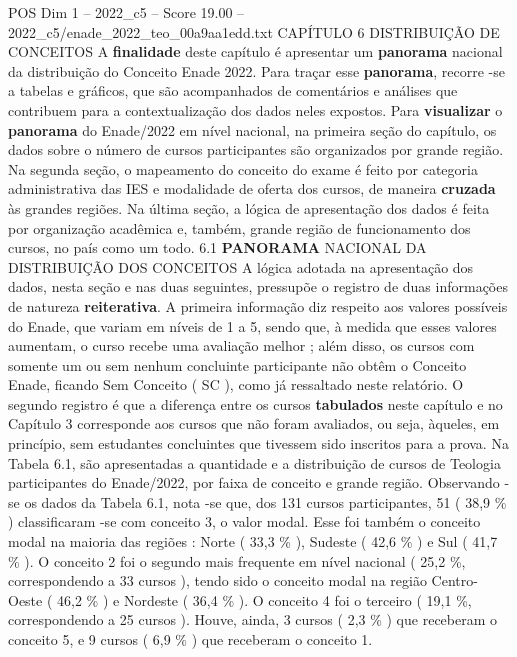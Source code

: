 \begin{textsample}{POS Dim 1 – 2022\_c5 – Score 19.00 – 2022\_c5/enade\_2022\_teo\_00a9aa1edd.txt}  \label{ex:f1_pos_030}
CAPÍTULO 6 DISTRIBUIÇÃO DE CONCEITOS A \textbf{finalidade} deste capítulo é apresentar um \textbf{panorama} nacional da distribuição do Conceito Enade 2022.
Para traçar esse \textbf{panorama}, recorre -se a tabelas e gráficos, que são acompanhados de comentários e análises que contribuem para a contextualização dos dados neles expostos.
Para \textbf{visualizar} o \textbf{panorama} do Enade/2022 em nível nacional, na primeira seção do capítulo, os dados sobre o número de cursos participantes são organizados por grande região.
Na segunda seção, o mapeamento do conceito do exame é feito por categoria administrativa das IES e modalidade de oferta dos cursos, de maneira \textbf{cruzada} às grandes regiões.
Na última seção, a lógica de apresentação dos dados é feita por organização acadêmica e, também, grande região de funcionamento dos cursos, no país como um todo. 6.1 \textbf{PANORAMA} NACIONAL DA DISTRIBUIÇÃO DOS CONCEITOS A lógica adotada na apresentação dos dados, nesta seção e nas duas seguintes, pressupõe o registro de duas informações de natureza \textbf{reiterativa}.
A primeira informação diz respeito aos valores possíveis do Enade, que variam em níveis de 1 a 5, sendo que, à medida que esses valores aumentam, o curso recebe uma avaliação melhor ; além disso, os cursos com somente um ou sem nenhum concluinte participante não obtêm o Conceito Enade, ficando Sem Conceito ( SC ), como já ressaltado neste relatório.
O segundo registro é que a diferença entre os cursos \textbf{tabulados} neste capítulo e no Capítulo 3 corresponde aos cursos que não foram avaliados, ou seja, àqueles, em princípio, sem estudantes concluintes que tivessem sido inscritos para a prova.
Na Tabela 6.1, são apresentadas a quantidade e a distribuição de cursos de Teologia participantes do Enade/2022, por faixa de conceito e grande região.
Observando -se os dados da Tabela 6.1, nota -se que, dos 131 cursos participantes, 51 ( 38,9 \% ) classificaram -se com conceito 3, o valor modal.
Esse foi também o conceito modal na maioria das regiões : Norte ( 33,3 \% ), Sudeste ( 42,6 \% ) e Sul ( 41,7 \% ).
O conceito 2 foi o segundo mais frequente em nível nacional ( 25,2 \%, correspondendo a 33 cursos ), tendo sido o conceito modal na região Centro-Oeste ( 46,2 \% ) e Nordeste ( 36,4 \% ).
O conceito 4 foi o terceiro ( 19,1 \%, correspondendo a 25 cursos ).
Houve, ainda, 3 cursos ( 2,3 \% ) que receberam o conceito 5, e 9 cursos ( 6,9 \% ) que receberam o conceito 1.

\end{textsample}
